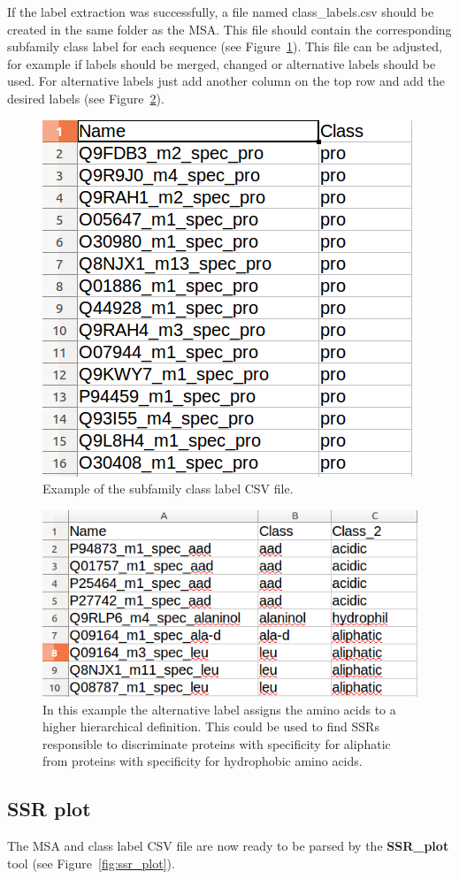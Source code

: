 \documentclass[a4paper,10pt]{article}
\begin{document}
If the label extraction was successfully, a file named class\_labels.csv should be created in the same folder as the MSA. 
This file should contain the corresponding subfamily class label for each sequence (see Figure~\ref{fig:class_labels}).
This file can be adjusted, for example if labels should be merged, changed or alternative labels should be used.
For alternative labels just add another column on the top row and add the desired labels (see Figure~\ref{fig:alter_label}).

\begin{figure}
  \includegraphics[width=0.5\linewidth]{./figs/class_labels}
  \caption{Example of the subfamily class label CSV file.}
  \label{fig:class_labels}
\end{figure}

\begin{figure}
  \includegraphics[width=0.5\linewidth]{./figs/alter_label}
  \caption{In this example the alternative label assigns the amino acids to a higher hierarchical definition.
  This could be used to find SSRs responsible to discriminate proteins with specificity for aliphatic from proteins with specificity for 
  hydrophobic amino acids.}
  \label{fig:alter_label}
\end{figure}

\subsection{SSR plot}

The MSA and class label CSV file are now ready to be parsed by the \textbf{SSR\_plot} tool (see Figure~\ref{fig:ssr_plot}).
\end{document}
